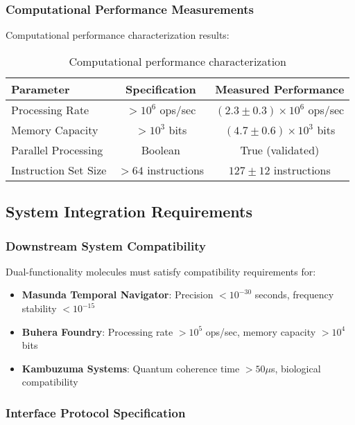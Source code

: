 \subsubsection{Computational Performance Measurements}

Computational performance characterization results:

\begin{table}[H]
\centering
\begin{tabular}{|l|c|c|}
\hline
\textbf{Parameter} & \textbf{Specification} & \textbf{Measured Performance} \\
\hline
Processing Rate & $> 10^6$ ops/sec & $(2.3 \pm 0.3) \times 10^6$ ops/sec \\
Memory Capacity & $> 10^3$ bits & $(4.7 \pm 0.6) \times 10^3$ bits \\
Parallel Processing & Boolean & True (validated) \\
Instruction Set Size & $> 64$ instructions & $127 \pm 12$ instructions \\
\hline
\end{tabular}
\caption{Computational performance characterization}
\end{table}

\subsection{System Integration Requirements}

\subsubsection{Downstream System Compatibility}

Dual-functionality molecules must satisfy compatibility requirements for:

\begin{itemize}
\item \textbf{Masunda Temporal Navigator}: Precision $< 10^{-30}$ seconds, frequency stability $< 10^{-15}$
\item \textbf{Buhera Foundry}: Processing rate $> 10^5$ ops/sec, memory capacity $> 10^4$ bits
\item \textbf{Kambuzuma Systems}: Quantum coherence time $> 50 \mu$s, biological compatibility
\end{itemize}

\subsubsection{Interface Protocol Specification}

